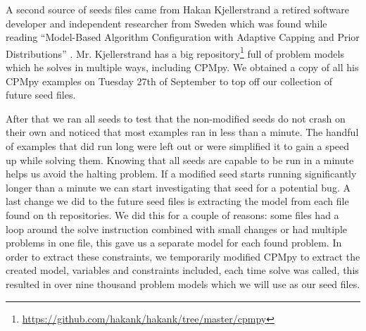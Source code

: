 A second source of seeds files came from Hakan Kjellerstrand a retired software developer and independent researcher from Sweden which was found while reading “Model-Based Algorithm Configuration with Adaptive Capping and Prior Distributions” \cite{18bleukx2022model}. Mr. Kjellerstrand has a big repository\footnote{\url{https://github.com/hakank/hakank/tree/master/cpmpy}} full of problem models which he solves in multiple ways, including CPMpy. We obtained a copy of all his CPMpy examples on Tuesday 27th of September to top off our collection of future seed files.


After that we ran all seeds to test that the non-modified seeds do not crash on their own and noticed that most examples ran in less than a minute. The handful of examples that did run long were left out or were simplified it to gain a speed up while solving them. Knowing that all seeds are capable to be run in a minute helps us avoid the halting problem. If a modified seed starts running significantly longer than a minute we can start investigating that seed for a potential bug. A last change we did to the future seed files is extracting the model from each file found on th repositories. We did this for a couple of reasons: some files had a loop around the solve instruction combined with small changes or had multiple problems in one file, this gave us a separate model for each found problem. In order to extract these constraints, we temporarily modified CPMpy to extract the created model, variables and constraints included, each time solve was called, this resulted in over nine thousand problem models which we will use as our seed files.



